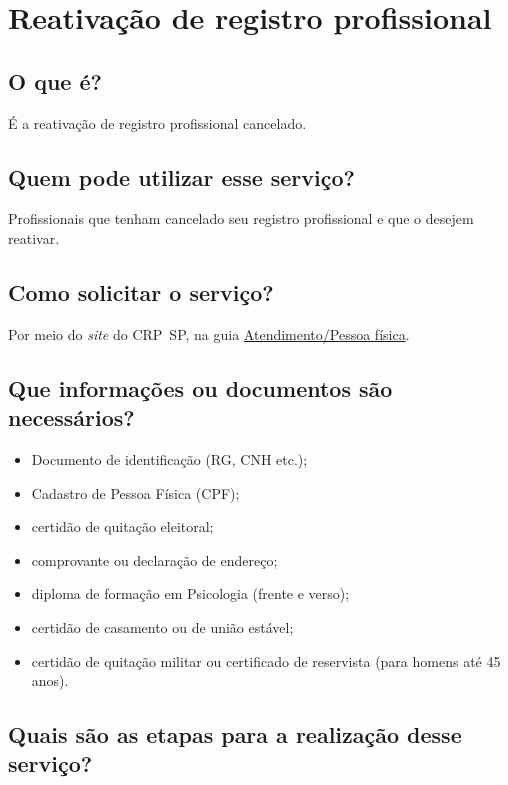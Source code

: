 \chapter{Reativação de registro profissional}
\label{chap:pf-reativacao}

\section{O que é?}

É a reativação de registro profissional cancelado.

\section{Quem pode utilizar esse serviço?}

Profissionais que tenham cancelado seu registro profissional e que o desejem reativar.

\section{Como solicitar o serviço?}

Por meio do \emph{site} do CRP~SP, na guia \href{https://www.crpsp.org/pagina/view/314}{Atendimento/Pessoa física}.

\section{Que informações ou documentos são necessários?}

\begin{itemize}
  \item  Documento de identificação (RG, CNH etc.);
  \item  Cadastro de Pessoa Física (CPF);
  \item  certidão de quitação eleitoral;
  \item  comprovante ou declaração de endereço;
  \item  diploma de formação em Psicologia (frente e verso);
  \item  certidão de casamento ou de união estável;
  \item  certidão de quitação militar ou certificado de reservista (para homens  até 45 anos).
\end{itemize}

\section{Quais são as etapas para a realização desse serviço?}

